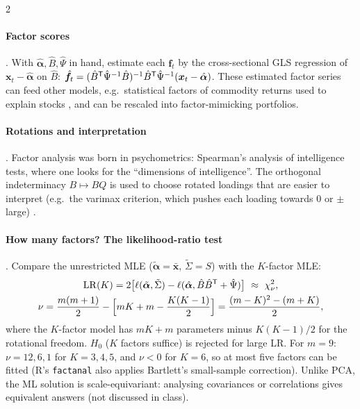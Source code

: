 \begin{paracol}{2}
\paragraph{Factor scores} . With $\hat{\bm\alpha},\hat B,\hat\Psi$ in hand, estimate each $\bm f_t$ by the
cross-sectional GLS regression of $\bm x_t-\hat{\bm\alpha}$ on $\hat B$:
$\hat{\bm f}_t=(\hat B^{\mathsf T}\hat\Psi^{-1}\hat B)^{-1}\hat B^{\mathsf T}\hat\Psi^{-1}(\bm x_t-\hat{\bm\alpha})$. These estimated factor series can feed other
models, e.g.\ statistical factors of commodity returns used to explain stocks , and can be
rescaled into factor-mimicking portfolios.

\paragraph{Rotations and interpretation} . Factor analysis was born in psychometrics:
Spearman's analysis of intelligence tests, where one looks for the ``dimensions of intelligence''. The
orthogonal indeterminacy $B\mapsto BQ$ is used to choose rotated loadings that are easier to interpret (e.g.\ the
varimax criterion, which pushes each loading towards $0$ or $\pm$ large) .

\paragraph{How many factors? The likelihood-ratio test} . Compare the unrestricted MLE
($\tilde{\bm\alpha}=\bar{\bm x}$, $\tilde\Sigma=S$) with the $K$-factor MLE:
\[\begin{gathered}
  \mathrm{LR}(K)=2\bigl[\ell(\tilde{\bm\alpha},\tilde\Sigma)-\ell(\hat{\bm\alpha},\hat B\hat B^{\mathsf T}+\hat\Psi)\bigr]\ \approx\ \chi^2_\nu,\\
  \nu=\frac{m(m+1)}2-\Bigl[mK+m-\frac{K(K-1)}2\Bigr]=\frac{(m-K)^2-(m+K)}2 ,
\end{gathered}\]
where the $K$-factor model has $mK+m$ parameters minus $K(K-1)/2$ for the rotational freedom. $H_0$ ($K$ factors
suffice) is rejected for large $\mathrm{LR}$. For $m=9$: $\nu=12,6,1$ for $K=3,4,5$, and $\nu<0$ for $K=6$, so at most five
factors can be fitted (R's \texttt{factanal} also applies Bartlett's small-sample correction). Unlike PCA, the ML
solution is scale-equivariant: analysing covariances or correlations gives equivalent answers (not discussed in
class).


\end{paracol}
